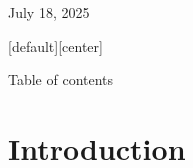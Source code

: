 \documentclass[11pt]{beamer}
\begin{document}
\begin{frame}
  \vfill

  \begin{center}
    \color{primary!60!black}
    \footnotesize July 18, 2025
  \end{center}
  \vspace{0.5cm}
\end{frame}

[default][center]

\begin{frame}{Table of contents}
  \tableofcontents
\end{frame}

\section{Introduction}
\end{document}
